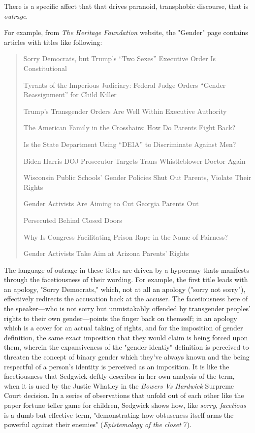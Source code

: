\documentclass[11pt]{article}
\begin{document}
There is a specific affect that that drives paranoid, transphobic
discourse, that is \emph{outrage}.

For example, from \emph{The Heritage Foundation} website, the "Gender" page
contains articles with titles like following:
\begin{quote}
Sorry Democrats, but Trump’s “Two Sexes” Executive Order Is
Constitutional

Tyrants of the Imperious Judiciary: Federal Judge Orders “Gender
Reassignment” for Child Killer

Trump’s Transgender Orders Are Well Within Executive Authority

The American Family in the Crosshairs: How Do Parents Fight Back?

Is the State Department Using “DEIA” to Discriminate Against Men?

Biden-Harris DOJ Prosecutor Targets Trans Whistleblower Doctor Again

Wisconsin Public Schools’ Gender Policies Shut Out Parents, Violate
Their Rights

Gender Activists Are Aiming to Cut Georgia Parents Out

Persecuted Behind Closed Doors

Why Is Congress Facilitating Prison Rape in the Name of Fairness?

Gender Activists Take Aim at Arizona Parents’ Rights
\end{quote}
The language of outrage in these titles are driven by a hypocrasy
thats manifests through the facetiousness of their wording. For
example, the first title leads with an apology, "Sorry Democrats,"
which, not at all an apology ("sorry not sorry"), effectively
redirects the accusation back at the accuser. The facetiousness here
of the speaker---who is not sorry but unmistakably offended by
transgender peoples' rights to their own gender---points the finger
back on themself; in an apology which is a cover for an actual taking
of rights, and for the imposition of gender definition, the same exact
imposition that they would claim is being forced upon them, wherein
the expansiveness of the "gender identiy" definition is perceived to
threaten the concept of binary gender which they've always known and
the being respectful of a person's identity is perceived as an
imposition. It is like the facetiousness that Sedgwick deftly
describes in her own analysis of the term, when it is used by the
Justic Whatley in the \emph{Bowers Vs Hardwick} Surpreme Court decision. In
a series of observations that unfold out of each other like the paper
fortune teller game for children, Sedgwick shows how, like \emph{sorry},
\emph{facetious} is a dumb but effective term, "demonstrating how
obtuseness itself arms the powerful against their enemies"
(\emph{Epistemology of the closet} 7).
\end{document}
